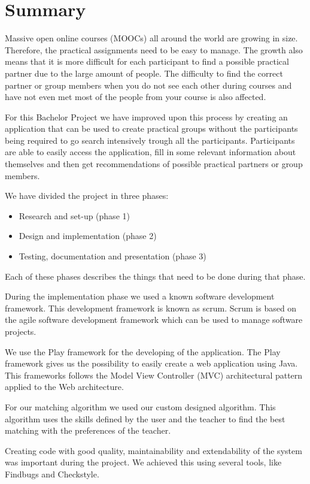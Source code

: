 \chapter*{Summary}

Massive open online courses (MOOCs) all around the world are growing in size. 
Therefore, the practical assignments need to be easy to manage.
The growth also means that it is more difficult for each participant to find a possible practical partner due to the large amount of people.
The difficulty to find the correct partner or group members when you do not see each other during courses and have not even met most of the people from your course is also affected.

For this Bachelor Project we have improved upon this process by creating an application that can be used to create practical groups without the participants being required to go search intensively trough all the participants.
Participants are able to easily access the application, fill in some relevant information about themselves and then get recommendations of possible practical partners or group members.

We have divided the project in three phases:
\begin{itemize}
\item Research and set-up (phase 1)
\item Design and implementation (phase 2)
\item Testing, documentation and presentation (phase 3)
\end{itemize}
Each of these phases describes the things that need to be done during that phase.

During the implementation phase we used a known software development framework.
This development framework is known as scrum.
Scrum is based on the agile software development framework which can be used to 
manage software projects.

We use the Play framework for the developing of the application. 
The Play framework gives us the possibility to easily create a web application using Java.
This frameworks follows the Model View Controller (MVC) architectural pattern applied to the Web architecture.

For our matching algorithm we used our custom designed algorithm.
This algorithm uses the skills defined by the user and the teacher to find the best matching with the preferences of the teacher.


Creating code with good quality, maintainability and extendability of the system was important during the project.
We achieved this using several tools, like Findbugs and Checkstyle.

